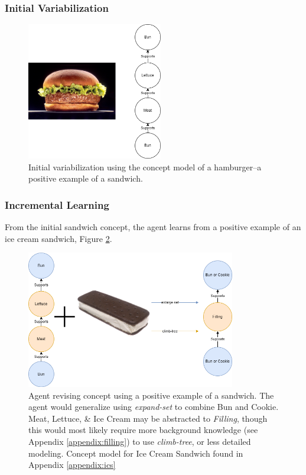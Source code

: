 \subsubsection{Initial Variabilization}
\begin{figure}[H]
	\centering
	\includegraphics[height=6cm]{Figures/hamburger.png}
	\caption{Initial variabilization using the concept model of a hamburger--a positive example of a sandwich.}
	\label{fig:hamburger-concept}
\end{figure}
\subsubsection{Incremental Learning}
From the initial sandwich concept, the agent learns from a positive example of an ice cream sandwich, Figure \ref{fig:step1}.
\begin{figure}[H]
	\centering
	\includegraphics[height=6cm]{Figures/step1.png}
	\caption{Agent revising concept using a positive example of a sandwich. The agent would generalize using \textit{expand-set} to combine Bun and Cookie. Meat, Lettuce, \& Ice Cream may be abstracted to \textit{Filling}, though this would most likely require more background knowledge (see Appendix \ref{appendix:filling}) to use \textit{climb-tree}, or less detailed modeling. Concept model for Ice Cream Sandwich found in Appendix \ref{appendix:ics}}
	\label{fig:step1}
\end{figure}

